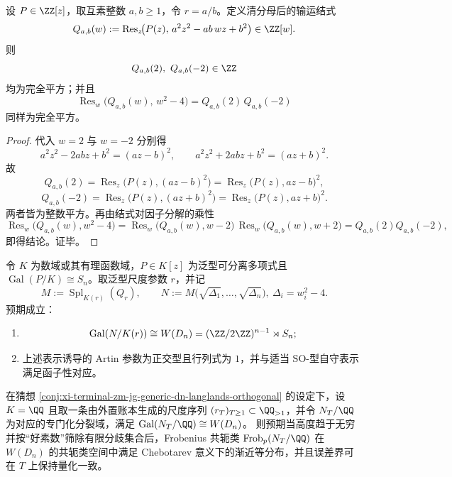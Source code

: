 \begin{theorem}\label{thm:xi-terminal-zm-godel-integer-transport-square-audit}
设 \(P\in\ZZ[z]\)，取互素整数 \(a,b\ge 1\)，令 \(r=a/b\)。定义清分母后的输运结式
\[
Q_{a,b}(w):=\operatorname{Res}_z\!\bigl(P(z),\,a^2 z^2-a b\,w z+b^2\bigr)\in\ZZ[w].
\]
则
\[
Q_{a,b}(2),\ Q_{a,b}(-2)\in\ZZ
\]
均为完全平方；并且
\[
\operatorname{Res}_w\!\bigl(Q_{a,b}(w),\,w^2-4\bigr)=Q_{a,b}(2)\,Q_{a,b}(-2)
\]
同样为完全平方。
\end{theorem}
\begin{proof}
代入 \(w=2\) 与 \(w=-2\) 分别得
\[
a^2 z^2-2ab z+b^2=(a z-b)^2,\qquad
a^2 z^2+2ab z+b^2=(a z+b)^2.
\]
故
\[
Q_{a,b}(2)=\operatorname{Res}_z\!\bigl(P(z),(a z-b)^2\bigr)
=\operatorname{Res}_z\!\bigl(P(z),a z-b\bigr)^2,
\]
\[
Q_{a,b}(-2)=\operatorname{Res}_z\!\bigl(P(z),(a z+b)^2\bigr)
=\operatorname{Res}_z\!\bigl(P(z),a z+b\bigr)^2.
\]
两者皆为整数平方。再由结式对因子分解的乘性
\[
\operatorname{Res}_w\!\bigl(Q_{a,b}(w),w^2-4\bigr)
=\operatorname{Res}_w\!\bigl(Q_{a,b}(w),w-2\bigr)\,
\operatorname{Res}_w\!\bigl(Q_{a,b}(w),w+2\bigr)
=Q_{a,b}(2)Q_{a,b}(-2),
\]
即得结论。证毕。
\end{proof}

\begin{conjecture}\label{conj:xi-terminal-zm-jg-generic-dn-langlands-orthogonal}
令 \(K\) 为数域或其有理函数域，\(P\in K[z]\) 为泛型可分离多项式且 \(\operatorname{Gal}(P/K)\cong S_n\)。取泛型尺度参数 \(r\)，并记
\[
M:=\operatorname{Spl}_{K(r)}(Q_r),\qquad
N:=M\bigl(\sqrt{\Delta_1},\dots,\sqrt{\Delta_n}\bigr),\ \Delta_i=w_i^2-4.
\]
预期成立：
\begin{enumerate}
  \item
  \[
  \operatorname{Gal}(N/K(r))\cong W(D_n)=(\ZZ/2\ZZ)^{n-1}\rtimes S_n;
  \]
  \item 上述表示诱导的 Artin 参数为正交型且行列式为 \(1\)，并与适当 \(\mathrm{SO}\)-型自守表示满足函子性对应。
\end{enumerate}
\end{conjecture}

\begin{conjecture}\label{conj:xi-terminal-zm-jg-wdn-chebotarev-uniform}
在猜想 \ref{conj:xi-terminal-zm-jg-generic-dn-langlands-orthogonal} 的设定下，设 \(K=\QQ\) 且取一条由外置账本生成的尺度序列 \((r_T)_{T\ge 1}\subset\QQ_{>1}\)，并令 \(N_T/\QQ\) 为对应的专门化分裂域，满足 \(\operatorname{Gal}(N_T/\QQ)\cong W(D_n)\)。
则预期当高度趋于无穷并按“好素数”筛除有限分歧集合后，Frobenius 共轭类 \(\operatorname{Frob}_p(N_T/\QQ)\) 在 \(W(D_n)\) 的共轭类空间中满足 Chebotarev 意义下的渐近等分布，并且误差界可在 \(T\) 上保持量化一致。
\end{conjecture}

